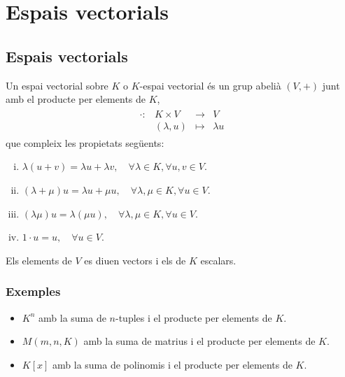 \section{Espais vectorials}
\subsection{Espais vectorials}
Un espai vectorial sobre $K$ o $K$-espai vectorial és un grup abelià $(V,+)$ junt amb el producte per elements de $K$, 
\begin{align}
    \begin{matrix}
        \cdot: & K \times V & \to & V \\
        & (\lambda, u) & \mapsto & \lambda u
    \end{matrix}
\end{align}
que compleix les propietats següents:
\begin{enumerate}[i)]
    \item $\lambda (u + v) = \lambda u + \lambda v , \quad \forall \lambda \in K, \forall u , v \in V$.
    \item $(\lambda + \mu) u = \lambda u + \mu u , \quad \forall \lambda , \mu \in K, \forall u \in V$.
    \item $(\lambda \mu) u = \lambda (\mu u) , \quad \forall \lambda , \mu \in K, \forall u \in V$.
    \item $ 1 \cdot u = u, \quad \forall u \in V$.
\end{enumerate}

Els elements de $V$ es diuen vectors i els de $K$ escalars.

\subsubsection*{Exemples}
\begin{itemize}
    \item $K^{n}$ amb la suma de $n$-tuples i el producte per elements de $K$.
    \item $M(m,n,K)$ amb la suma de matrius i el producte per elements de $K$.
    \item $K [x]$ amb la suma de polinomis i el producte per elements de $K$.
\end{itemize}

